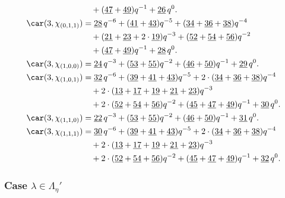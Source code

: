 \begin{align*}
	&\quad+(\underline{47}+\underline{49})q^{-1}+\underline{26}\,q^0.\\
	\car(3,\chi_{(0,1,1)})
	&=\underline{28}\,q^{-6}+(\underline{41}+\underline{43})q^{-5}+(\underline{34}+\underline{36}+\underline{38})q^{-4}\\
	&\quad+(\underline{21}+\underline{23}+2\cdot\underline{19})q^{-3}+(\underline{52}+\underline{54}+\underline{56})q^{-2}\\
	&\quad+(\underline{47}+\underline{49})q^{-1}+\underline{28}\,q^0.\\
	\car(3,\chi_{(1,0,0)})
	&=\underline{24}\,q^{-3}+(\underline{53}+\underline{55})q^{-2}+(\underline{46}+\underline{50})q^{-1}+\underline{29}\,q^0.\\
	\car(3,\chi_{(1,0,1)})
	&=\underline{32}\,q^{-6}+(\underline{39}+\underline{41}+\underline{43})q^{-5}+2\cdot(\underline{34}+\underline{36}+\underline{38})q^{-4}\\
	&\quad+2\cdot(\underline{13}+\underline{17}+\underline{19}+\underline{21}+\underline{23})q^{-3}\\
	&\quad+2\cdot(\underline{52}+\underline{54}+\underline{56})q^{-2}+(\underline{45}+\underline{47}+\underline{49})q^{-1}+\underline{30}\,q^0.\\
	\car(3,\chi_{(1,1,0)})
	&=\underline{22}\,q^{-3}+(\underline{53}+\underline{55})q^{-2}+(\underline{46}+\underline{50})q^{-1}+\underline{31}\,q^0.\\
	\car(3,\chi_{(1,1,1)})
	&=\underline{30}\,q^{-6}+(\underline{39}+\underline{41}+\underline{43})q^{-5}+2\cdot(\underline{34}+\underline{36}+\underline{38})q^{-4}\\
	&\quad+2\cdot(\underline{13}+\underline{17}+\underline{19}+\underline{21}+\underline{23})q^{-3}\\
	&\quad+2\cdot(\underline{52}+\underline{54}+\underline{56})q^{-2}+(\underline{45}+\underline{47}+\underline{49})q^{-1}+\underline{32}\,q^0.
\end{align*}

\subsubsection{Case $\lambda\in \Lambda_\eta'$}

